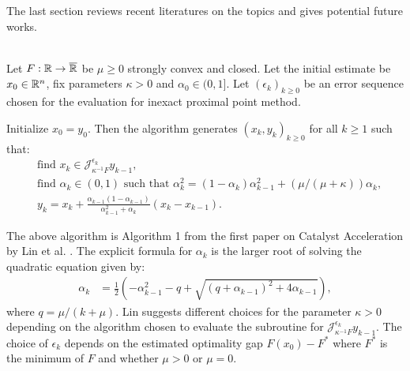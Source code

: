 \documentclass[12pt]{article}
\begin{document}
        The last section reviews recent literatures on the topics and gives potential future works. 
        \begin{definition}\label{def:lin-catalyst-original}\; \\
            Let $F:\mathbb R \rightarrow \overline {\mathbb R}$ be $\mu \ge 0$ strongly convex and closed. 
            Let the initial estimate be $x_0 \in \mathbb R^n$, fix parameters $\kappa > 0$ and $\alpha_0 \in (0, 1]$. 
            Let $(\epsilon_k)_{k \ge 0}$ be an error sequence chosen for the evaluation for inexact proximal point method. 
            \begin{tcolorbox}
                Initialize $x_0 = y_0$. Then the algorithm generates $(x_k, y_k)_{k\ge 0}$ for all $k \ge 1$ such that: 
                \begin{align*}
                    & \text{find } x_k \in \mathcal J_{\kappa^{-1}F}^{\epsilon_k} y_{k - 1}, 
                    \\
                    & \text{find } \alpha_k \in (0, 1) \text{ such that } \alpha_k^2 = (1 - \alpha_k)\alpha_{k - 1}^2 + (\mu/(\mu + \kappa))\alpha_k,
                    \\
                    & 
                    y_{k} = x_k + \frac{\alpha_{k - 1}(1 - \alpha_{k - 1})}{\alpha_{k - 1}^2 + \alpha_k}(x_k - x_{k - 1}). 
                \end{align*}
            \end{tcolorbox}
        \end{definition}
        \begin{remark}
            The above algorithm is Algorithm 1 from the first paper on Catalyst Acceleration by Lin et al. \cite{lin_universal_2015}. 
            The explicit formula for $\alpha_k$ is the larger root of solving the quadratic equation given by: 
            \begin{align*}
                \alpha_k &= 
                \frac{1}{2}\left(
                    - \alpha_{k - 1}^2 - q + \sqrt{(q + \alpha_{k - 1})^2 + 4 \alpha_{k - 1}}
                \right), 
            \end{align*}
            where $q = \mu/(k + \mu)$. 
            Lin suggests different choices for the parameter $\kappa > 0$ depending on the algorithm chosen to evaluate the subroutine for $\mathcal J_{\kappa^{-1}F}^{\epsilon_k}y_{k - 1}$. 
            The choice of $\epsilon_k$ depends on the estimated optimality gap $F(x_0) - F^*$ where $F^*$ is the minimum of $F$ and whether $\mu > 0$ or $\mu = 0$. 
        \end{remark}
\end{document}
